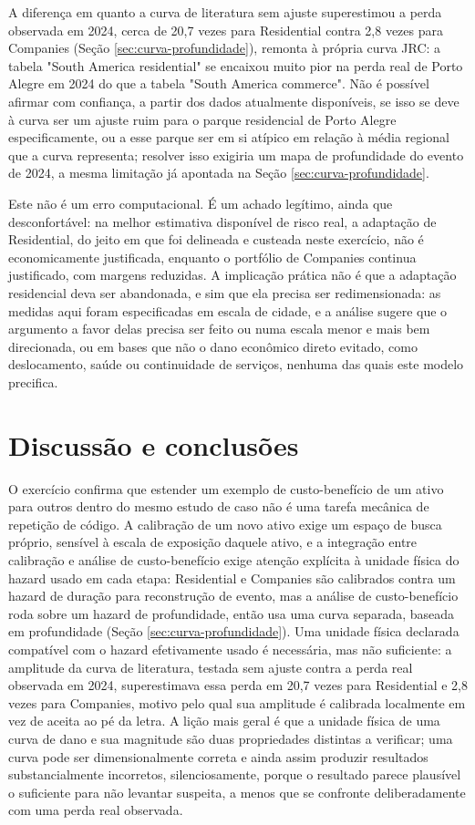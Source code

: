 \documentclass[11pt]{article}
\begin{document}
A diferença em quanto a curva de literatura sem ajuste superestimou a perda observada em
2024, cerca de 20,7 vezes para Residential contra 2,8 vezes para Companies (Seção
\ref{sec:curva-profundidade}), remonta à própria curva JRC: a tabela "South America
residential" se encaixou muito pior na perda real de Porto Alegre em 2024 do que a tabela
"South America commerce". Não é possível afirmar com confiança, a partir dos dados
atualmente disponíveis, se isso se deve à curva ser um ajuste ruim para o parque
residencial de Porto Alegre especificamente, ou a esse parque ser em si atípico em relação
à média regional que a curva representa; resolver isso exigiria um mapa de profundidade do
evento de 2024, a mesma limitação já apontada na Seção \ref{sec:curva-profundidade}.

Este não é um erro computacional. É um achado legítimo, ainda que desconfortável: na
melhor estimativa disponível de risco real, a adaptação de Residential, do jeito em que foi
delineada e custeada neste exercício, não é economicamente justificada, enquanto o
portfólio de Companies continua justificado, com margens reduzidas. A implicação prática não
é que a adaptação residencial deva ser abandonada, e sim que ela precisa ser redimensionada:
as medidas aqui foram especificadas em escala de cidade, e a análise sugere que o argumento
a favor delas precisa ser feito ou numa escala menor e mais bem direcionada, ou em bases
que não o dano econômico direto evitado, como deslocamento, saúde ou continuidade de
serviços, nenhuma das quais este modelo precifica.

\section{Discussão e conclusões}

O exercício confirma que estender um exemplo de custo-benefício de um ativo para outros
dentro do mesmo estudo de caso não é uma tarefa mecânica de repetição de código. A
calibração de um novo ativo exige um espaço de busca próprio, sensível à escala de
exposição daquele ativo, e a integração entre calibração e análise de custo-benefício
exige atenção explícita à unidade física do hazard usado em cada etapa: Residential e
Companies são calibrados contra um hazard de duração para reconstrução de evento, mas a
análise de custo-benefício roda sobre um hazard de profundidade, então usa uma curva
separada, baseada em profundidade (Seção \ref{sec:curva-profundidade}). Uma unidade física
declarada compatível com o hazard efetivamente usado é necessária, mas não suficiente: a
amplitude da curva de literatura, testada sem ajuste contra a perda real observada em 2024,
superestimava essa perda em 20,7 vezes para Residential e 2,8 vezes para Companies, motivo
pelo qual sua amplitude é calibrada localmente em vez de aceita ao pé da letra. A lição mais
geral é que a unidade física de uma curva de dano e sua magnitude são duas propriedades
distintas a verificar; uma curva pode ser dimensionalmente correta e ainda assim produzir
resultados substancialmente incorretos, silenciosamente, porque o resultado parece
plausível o suficiente para não levantar suspeita, a menos que se confronte deliberadamente
com uma perda real observada.
\end{document}

